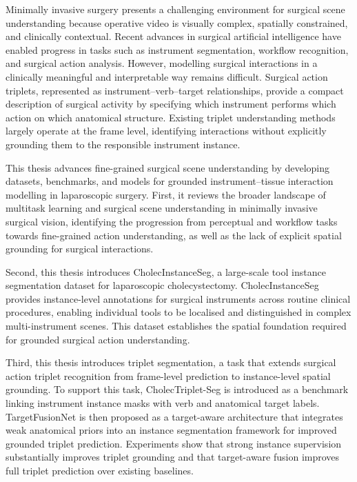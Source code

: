 Minimally invasive surgery presents a challenging environment for surgical scene understanding because operative video is visually complex, spatially constrained, and clinically contextual. Recent advances in surgical artificial intelligence have enabled progress in tasks such as instrument segmentation, workflow recognition, and surgical action analysis. However, modelling surgical interactions in a clinically meaningful and interpretable way remains difficult. Surgical action triplets, represented as instrument--verb--target relationships, provide a compact description of surgical activity by specifying which instrument performs which action on which anatomical structure. Existing triplet understanding methods largely operate at the frame level, identifying interactions without explicitly grounding them to the responsible instrument instance.

This thesis advances fine-grained surgical scene understanding by developing datasets, benchmarks, and models for grounded instrument--tissue interaction modelling in laparoscopic surgery. First, it reviews the broader landscape of multitask learning and surgical scene understanding in minimally invasive surgical vision, identifying the progression from perceptual and workflow tasks towards fine-grained action understanding, as well as the lack of explicit spatial grounding for surgical interactions.

Second, this thesis introduces CholecInstanceSeg, a large-scale tool instance segmentation dataset for laparoscopic cholecystectomy. CholecInstanceSeg provides instance-level annotations for surgical instruments across routine clinical procedures, enabling individual tools to be localised and distinguished in complex multi-instrument scenes. This dataset establishes the spatial foundation required for grounded surgical action understanding.

Third, this thesis introduces triplet segmentation, a task that extends surgical action triplet recognition from frame-level prediction to instance-level spatial grounding. To support this task, CholecTriplet-Seg is introduced as a benchmark linking instrument instance masks with verb and anatomical target labels. TargetFusionNet is then proposed as a target-aware architecture that integrates weak anatomical priors into an instance segmentation framework for improved grounded triplet prediction. Experiments show that strong instance supervision substantially improves triplet grounding and that target-aware fusion improves full triplet prediction over existing baselines.

